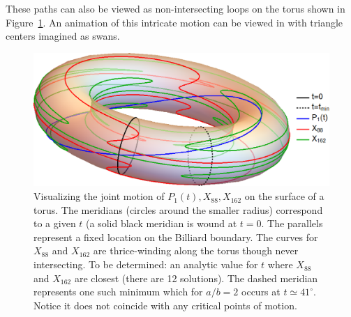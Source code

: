 These paths can also be viewed as non-intersecting loops on the torus shown in Figure~\ref{fig:3d-torus}. An animation of this intricate motion can be viewed in  \cite[PL\#14]{reznik2020-playlist-intriguing} with triangle centers imagined as swans.

\begin{figure}
    \centering
    \includegraphics[width=.75\textwidth]{pics/1160_torus_x88_x126_cropped.eps}
    \caption{Visualizing the joint motion of $P_1(t),X_{88},X_{162}$ on the surface of a torus. The meridians (circles around the smaller radius) correspond to a given $t$ (a solid black meridian is wound at $t=0$. The parallels represent a fixed location on the Billiard boundary. The curves for $X_{88}$ and $X_{162}$ are thrice-winding along the torus though never intersecting. To be determined: an analytic value for $t$ where $X_{88}$ and $X_{162}$ are closest (there are 12 solutions). The dashed meridian represents one such minimum which for $a/b=2$ occurs at $t{\simeq}41^\circ$. Notice it does not coincide with any critical points of motion.}
    \label{fig:3d-torus}
\end{figure}


